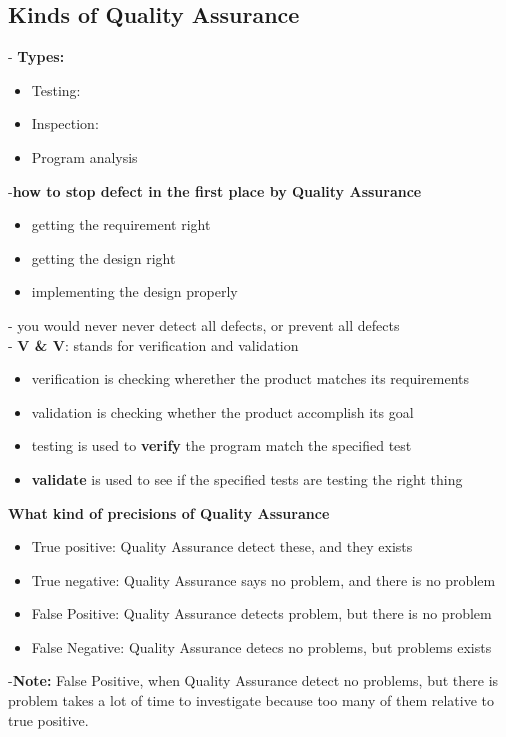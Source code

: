 \documentclass{article}
\begin{document}
\subsection{Kinds of Quality Assurance}
 - \textbf{Types:}
 \begin{itemize}
   \item Testing:
   \item Inspection:
   \item Program analysis
 \end{itemize}
 -\textbf{how to stop defect in the first place by Quality Assurance}
 \begin{itemize}
   \item getting the requirement right
   \item getting the design right
   \item implementing the design properly
 \end{itemize}
 - you would never never detect all defects, or prevent all defects\\
 - \textbf{V \& V}: stands for verification and validation
 \begin{itemize}
   \item verification is checking wherether the product matches its
   requirements
   \item validation is checking whether the product accomplish its goal
   \item testing is used to \textbf{verify} the program match the specified test
   \item \textbf{validate} is used to see if the specified tests are testing the
   right thing
 \end{itemize}
 
 \textbf{What kind of precisions of Quality Assurance}\begin{itemize}
   \item True positive: Quality Assurance detect these, and they exists
   \item True negative: Quality Assurance says no problem, and there is no
   problem
   \item False Positive: Quality Assurance detects problem, but there is no
   problem
   \item False Negative: Quality Assurance detecs no problems, but problems
   exists
 \end{itemize}
 -\textbf {Note:} False Positive, when Quality Assurance detect no problems, but
 there is problem takes a lot of time to investigate because too many of them
 relative to true positive. 
 
\end{document}
